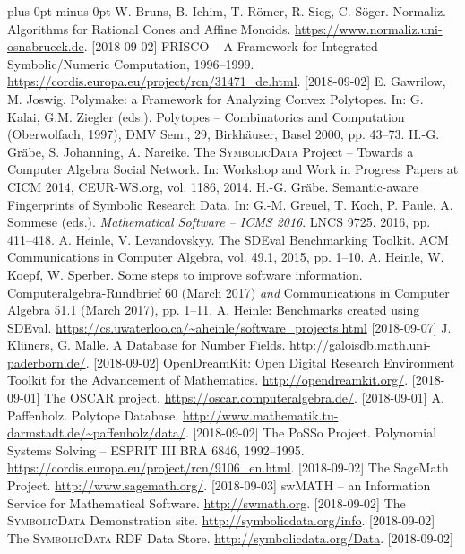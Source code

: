 \documentclass[11pt]{article}
\def\SD{\textsc{SymbolicData}}
\begin{document}
\begin{otherlanguage}{english}
\begin{multicols}{2}
\begin{thebibliography}{xxx}
\itemsep=0cm plus 0pt minus 0pt
 W. Bruns, B. Ichim, T. R\"omer, R. Sieg, C. S\"oger.
  \newblock Normaliz. Algorithms for Rational Cones and Affine Monoids.
  \newblock \url{https://www.normaliz.uni-osnabrueck.de}. [2018-09-02]
 FRISCO -- A Framework for Integrated Symbolic/Numeric
  Computation, 1996--1999.  \newblock
  \url{https://cordis.europa.eu/project/rcn/31471_de.html}.  [2018-09-02]
 E. Gawrilow, M. Joswig. \newblock Polymake: a Framework for
  Analyzing Convex Polytopes. \newblock In: G. Kalai, G.M. Ziegler (eds.).
  \newblock Polytopes -- Combinatorics and Computation (Oberwolfach, 1997),
  DMV Sem., 29, Birkh\"auser, Basel 2000, pp. 43--73. 
 H.-G. Gr\"abe, S. Johanning, A. Nareike. \newblock The {\SD}
  Project -- Towards a Computer Algebra Social Network. \newblock In: Workshop
  and Work in Progress Papers at CICM 2014, CEUR-WS.org, vol. 1186, 2014.
 H.-G. Gr\"abe. \newblock Semantic-aware Fingerprints of
  Symbolic Research Data. \newblock In: G.-M. Greuel, T. Koch, P. Paule,
  A. Sommese (eds.). \newblock \emph{Mathematical Software -- ICMS 2016}.
  \newblock LNCS 9725, 2016, pp. 411--418. 
 A. Heinle, V. Levandovskyy. \newblock The SDEval
  Benchmarking Toolkit. \newblock ACM Communications in Computer Algebra,
  vol. 49.1, 2015, pp. 1--10.
 A. Heinle, W. Koepf, W. Sperber. \newblock Some steps to
  improve software information. \newblock Computeralgebra-Rundbrief 60 (March
  2017) \emph{and} Communications in Computer Algebra 51.1 (March 2017),
  pp. 1--11.
 A. Heinle: Benchmarks created using SDEval. \newblock
  \url{https://cs.uwaterloo.ca/~aheinle/software_projects.html} [2018-09-07]
 J. Kl\"uners, G. Malle. \newblock A Database for Number
  Fields.  \newblock \url{http://galoisdb.math.uni-paderborn.de/}. [2018-09-02]
 OpenDreamKit: Open Digital Research Environment Toolkit for the
  Advancement of Mathematics. \newblock \url{http://opendreamkit.org/}.
  [2018-09-01]
 The OSCAR project.  \newblock
  \url{https://oscar.computeralgebra.de/}.  [2018-09-01]
 A. Paffenholz. \newblock Polytope Database. \newblock 
  \url{http://www.mathematik.tu-darmstadt.de/~paffenholz/data/}.  [2018-09-02] 
 The PoSSo Project. Polynomial Systems Solving -- ESPRIT III BRA
  6846, 1992--1995. \newblock 
  \url{https://cordis.europa.eu/project/rcn/9106_en.html}.  [2018-09-02]
 The SageMath Project. \newblock
  \url{http://www.sagemath.org/}.  [2018-09-03]
 swMATH -- an Information Service for Mathematical Software.
  \newblock \url{http://swmath.org}. [2018-09-02]
 The {\SD} Demonstration site. \newblock 
  \url{http://symbolicdata.org/info}.  [2018-09-02]
 The {\SD} RDF Data Store. \newblock 
  \url{http://symbolicdata.org/Data}.  [2018-09-02]
\end{thebibliography}
                                                                 

\end{multicols}
\end{otherlanguage}
\end{document}
